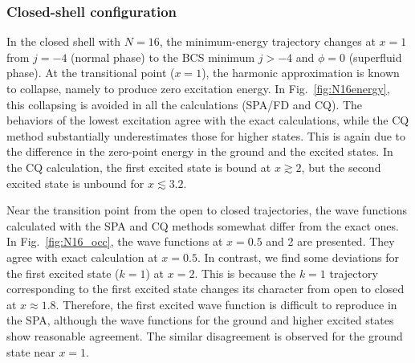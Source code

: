 \documentclass[%
superscriptaddress,
preprint,
showpacs,
nofootinbib,
amsmath,amssymb,
aps,
prc,
floatfix ]%
{revtex4-1}
\begin{document}
\subsubsection{Closed-shell configuration}


In the closed shell with $N=16$,
the minimum-energy trajectory changes at $x=1$ from
$j=-4$ (normal phase) to
the BCS minimum $j>-4$ and $\phi=0$ (superfluid phase).
At the transitional point ($x=1$), the harmonic approximation is
known to collapse, namely to produce zero excitation energy.
In Fig.~\ref{fig:N16energy},
this collapsing is avoided in all the calculations (SPA/FD and CQ).
The behaviors of the lowest excitation agree with the exact calculations,
while the CQ method substantially underestimates those for higher states.
This is again due to the difference in the zero-point energy in
the ground and the excited states.
In the CQ calculation, the first excited state is bound at $x\gtrsim 2$,
but the second excited state is unbound for $x\lesssim 3.2$.

Near the transition point from the open to closed trajectories,
the wave functions calculated with the SPA and CQ methods somewhat differ
from the exact ones.
In Fig.~\ref{fig:N16_occ}, the wave functions at $x=0.5$ and 2 are presented.
They agree with exact calculation at $x=0.5$.
In contrast, we find some deviations for the first excited state ($k=1$)
at $x=2$.
This is because the $k=1$ trajectory corresponding to the first excited state
changes its character from open to closed at $x\approx 1.8$.
Therefore, the first excited wave function is difficult to reproduce in
the SPA, although the wave functions for
the ground and higher excited states show reasonable agreement.
The similar disagreement is observed for the ground state near $x=1$.

\end{document}
